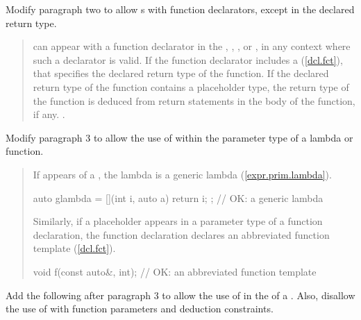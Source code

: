 Modify paragraph two to allow s
with function declarators, except in the declared return type.

\begin{quote}
\pnum
{} can appear with a function 
declarator in the , ,
, or , 
in any context where such a declarator is valid. 
% 
If the function declarator includes a  
(\ref{dcl.fct}), that specifies the declared return type of the function.
% 
If the declared return type of the function contains a placeholder type, the 
return type of the function is deduced from return statements in the body of 
the function, if any.
%
.
%
\end{quote}

Modify paragraph 3 to allow the use of  within the 
parameter type of a lambda or function.

\begin{quote}
\pnum
If  
appears  
 of a , the lambda 
is a generic lambda
(\ref{expr.prim.lambda}).
%
\enterexample
\begin{codeblock}
auto glambda = [](int i, auto a) { return i; }; // OK: a generic lambda
\end{codeblock}
\exitexample
%
\begin{addedblock}
Similarly, if a placeholder appears in a parameter type of a function 
declaration, the function declaration declares an abbreviated function 
template (\ref{dcl.fct}).
%
\enterexample
\begin{codeblock}
void f(const auto&, int); // OK: an abbreviated function template
\end{codeblock}
\exitexample
\end{addedblock}
\end{quote}


Add the following after paragraph 3 to allow the use of  in the
 of a .
Also, disallow the use of  with function parameters
and deduction constraints.

